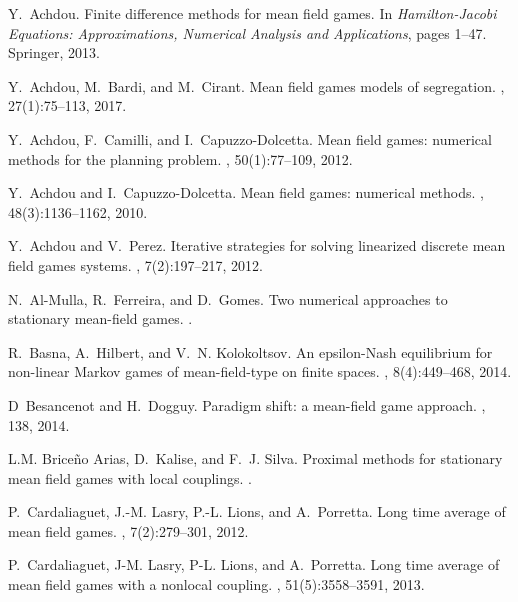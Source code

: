 \documentclass[12pt]{amsart}
\newcommand{\1}{{\chi}}
\theoremstyle{definition}
\begin{document}
\begin{thebibliography}{10}
	
	Y.~Achdou.
	\newblock Finite difference methods for mean field games.
	\newblock In {\em Hamilton-Jacobi Equations: Approximations, Numerical Analysis
		and Applications}, pages 1--47. Springer, 2013.
	
	Y.~Achdou, M.~Bardi, and M.~Cirant.
	\newblock Mean field games models of segregation.
	, 27(1):75--113, 2017.
	
	Y.~Achdou, F.~Camilli, and I.~Capuzzo-Dolcetta.
	\newblock Mean field games: numerical methods for the planning problem.
	, 50(1):77--109, 2012.
	
	Y.~Achdou and I.~Capuzzo-Dolcetta.
	\newblock Mean field games: numerical methods.
	, 48(3):1136--1162, 2010.
	
	Y.~Achdou and V.~Perez.
	\newblock Iterative strategies for solving linearized discrete mean field games
	systems.
	, 7(2):197--217, 2012.
	
	N.~Al-Mulla, R.~Ferreira, and D.~Gomes.
	\newblock Two numerical approaches to stationary mean-field games.
	.
	
	R.~Basna, A.~Hilbert, and V.~N. Kolokoltsov.
	\newblock An epsilon-{N}ash equilibrium for non-linear {M}arkov games of
	mean-field-type on finite spaces.
	, 8(4):449--468, 2014.
	
	D~Besancenot and H.~Dogguy.
	\newblock Paradigm shift: a mean-field game approach.
	, 138, 2014.
	
	L.M. Brice\~no Arias, D.~Kalise, and F.~J. Silva.
	\newblock Proximal methods for stationary mean field games with local
	couplings.
	.
	
	P.~Cardaliaguet, J.-M. Lasry, P.-L. Lions, and A.~Porretta.
	\newblock Long time average of mean field games.
	, 7(2):279--301, 2012.
	
	P.~Cardaliaguet, J-M. Lasry, P-L. Lions, and A.~Porretta.
	\newblock Long time average of mean field games with a nonlocal coupling.
	, 51(5):3558--3591,
	2013.
	

\end{thebibliography}
\end{document}
